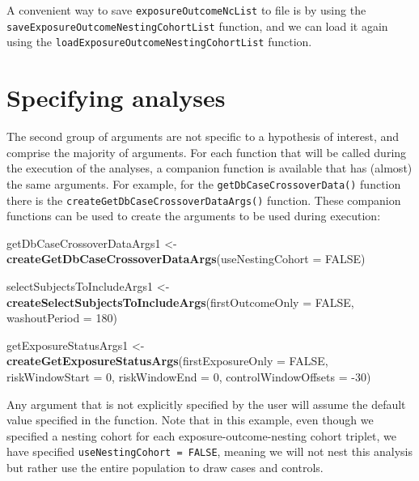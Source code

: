 \documentclass[]{article}
\newenvironment{Shaded}{\begin{snugshade}}{\end{snugshade}}
\newcommand{\DataTypeTok}[1]{\textcolor[rgb]{0.13,0.29,0.53}{#1}}
\newcommand{\DecValTok}[1]{\textcolor[rgb]{0.00,0.00,0.81}{#1}}
\newcommand{\KeywordTok}[1]{\textcolor[rgb]{0.13,0.29,0.53}{\textbf{#1}}}
\newcommand{\NormalTok}[1]{#1}
\newcommand{\OtherTok}[1]{\textcolor[rgb]{0.56,0.35,0.01}{#1}}
\newcommand{\StringTok}[1]{\textcolor[rgb]{0.31,0.60,0.02}{#1}}
\begin{document}
A convenient way to save \texttt{exposureOutcomeNcList} to file is by
using the \texttt{saveExposureOutcomeNestingCohortList} function, and we
can load it again using the
\texttt{loadExposureOutcomeNestingCohortList} function.

\hypertarget{specifying-analyses}{%
\section{Specifying analyses}\label{specifying-analyses}}

The second group of arguments are not specific to a hypothesis of
interest, and comprise the majority of arguments. For each function that
will be called during the execution of the analyses, a companion
function is available that has (almost) the same arguments. For example,
for the \texttt{getDbCaseCrossoverData()} function there is the
\texttt{createGetDbCaseCrossoverDataArgs()} function. These companion
functions can be used to create the arguments to be used during
execution:

\begin{Shaded}
\begin{Highlighting}[]
\NormalTok{getDbCaseCrossoverDataArgs1 <-}\StringTok{ }\KeywordTok{createGetDbCaseCrossoverDataArgs}\NormalTok{(}\DataTypeTok{useNestingCohort =} \OtherTok{FALSE}\NormalTok{)}

\NormalTok{selectSubjectsToIncludeArgs1 <-}\StringTok{ }\KeywordTok{createSelectSubjectsToIncludeArgs}\NormalTok{(}\DataTypeTok{firstOutcomeOnly =} \OtherTok{FALSE}\NormalTok{,}
                                                                  \DataTypeTok{washoutPeriod =} \DecValTok{180}\NormalTok{)}

\NormalTok{getExposureStatusArgs1 <-}\StringTok{ }\KeywordTok{createGetExposureStatusArgs}\NormalTok{(}\DataTypeTok{firstExposureOnly =} \OtherTok{FALSE}\NormalTok{,}
                                                      \DataTypeTok{riskWindowStart =} \DecValTok{0}\NormalTok{,}
                                                      \DataTypeTok{riskWindowEnd =} \DecValTok{0}\NormalTok{,}
                                                      \DataTypeTok{controlWindowOffsets =} \DecValTok{-30}\NormalTok{)}
\end{Highlighting}
\end{Shaded}

Any argument that is not explicitly specified by the user will assume
the default value specified in the function. Note that in this example,
even though we specified a nesting cohort for each
exposure-outcome-nesting cohort triplet, we have specified
\texttt{useNestingCohort\ =\ FALSE}, meaning we will not nest this
analysis but rather use the entire population to draw cases and
controls.
\end{document}
